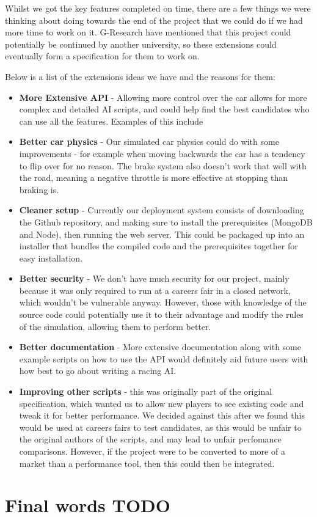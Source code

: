 Whilst we got the key features completed on time, there are a few things we were 
thinking about doing towards the end of the project that we could do if we had
more time to work on it. G-Research have mentioned that this project could
potentially be continued by another university, so these extensions could
eventually form a specification for them to work on.

Below is a list of the extensions ideas we have and the reasons for them:

\begin{itemize}
    \item
        \textbf{More Extensive API} - Allowing more control over the car allows
        for more complex and detailed AI scripts, and could help find the best
        candidates who can use all the features. Examples of this include 
    \item
        \textbf{Better car physics} - Our simulated car physics could do with
        some improvements - for example when moving backwards the car has a
        tendency to flip over for no reason. The brake system also doesn't work
        that well with the road, meaning a negative throttle is more effective
        at stopping than braking is.
    \item
        \textbf{Cleaner setup} - Currently our deployment system consists of
        downloading the Github repository, and making sure to install the
        prerequisites (MongoDB and Node), then running the web server. This
        could be packaged up into an installer that bundles the compiled code
        and the prerequisites together for easy installation.
    \item
        \textbf{Better security} - We don't have much security for our project,
        mainly because it was only required to run at a careers fair in a closed
        network, which wouldn't be vulnerable anyway. However, those with
        knowledge of the source code could potentially use it to their advantage
        and modify the rules of the simulation, allowing them to perform better.
    \item
        \textbf{Better documentation} - More extensive documentation along with
        some example scripts on how to use the API would definitely aid future
        users with how best to go about writing a racing AI.
    \item
        \textbf{Improving other scripts} - this was originally part of the
        original specification, which wanted us to allow new players to see
        existing code and tweak it for better performance. We decided against
        this after we found this would be used at careers fairs to test
        candidates, as this would be unfair to the original authors of the
        scripts, and may lead to unfair perfomance comparisons.
        However, if the project were to be converted to more of a market than a
        performance tool, then this could then be integrated.
\end{itemize}



\section{Final words TODO}
